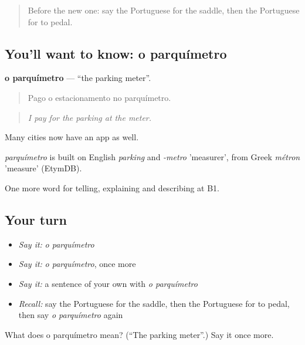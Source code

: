 \label{lesson:PT-C412-parquimetro}



\begin{quote}
Before the new one: say the Portuguese for the saddle, then the Portuguese for to pedal.
\end{quote}

\subsection*{You'll want to know: o parquímetro}
\textbf{o parquímetro} — \textquotedblleft{}the parking meter\textquotedblright{}.

\begin{quote}
Pago o estacionamento no parquímetro.
\end{quote}

\begin{quote}
\emph{I pay for the parking at the meter.}
\end{quote}

Many cities now have an app as well.

\begin{cousinweb}
\emph{parquímetro} is built on English \emph{parking} and \emph{-metro} 'measurer', from Greek \emph{métron} 'measure' (EtymDB).
\end{cousinweb}

\begin{grammarlens}[title={What you've built}]
One more word for telling, explaining and describing at B1.
\end{grammarlens}

\subsection*{Your turn}
\begin{itemize}
\raggedright
  \item \emph{Say it:} \emph{o parquímetro}
  \item \emph{Say it:} \emph{o parquímetro}, once more
  \item \emph{Say it:} a sentence of your own with \emph{o parquímetro}
  \item \emph{Recall:} say the Portuguese for the saddle, then the Portuguese for to pedal, then say \emph{o parquímetro} again
\end{itemize}

\begin{tcolorbox}[breakable,colback=teal!4,colframe=teal!35!black,title={Before you move on}]
What does o parquímetro mean? (\textquotedblleft{}The parking meter\textquotedblright{}.) Say it once more.
\end{tcolorbox}
